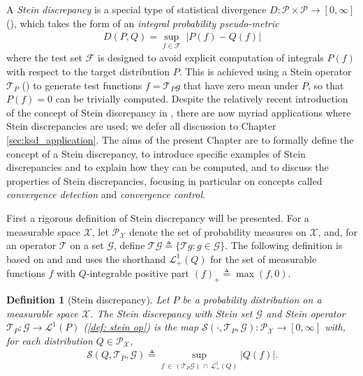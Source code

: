 \documentclass[12pt,paper=letter]{scrreprt}
\newtheorem{definition}{Definition}[chapter]
\def\defeq{\triangleq} %
\begin{document}
A \emph{Stein discrepancy} is a special type of statistical divergence $D : \mathcal{P} \times \mathcal{P} \rightarrow [0,\infty]$ (), which takes the form of an \emph{integral probability pseudo-metric} \citep{muller1997integral}
\begin{align}
    D(P,Q) = \sup_{f \in \mathcal{F}} \; | P(f) - Q(f) | \label{eq: ipm}
\end{align}
where the test set $\mathcal{F}$ is designed to avoid explicit computation of integrals $P(f)$ with respect to the target distribution $P$.
This is achieved using a Stein operator $\mathcal{T}_P$ () to generate test functions $f = \mathcal{T}_P g$ that have zero mean under $P$, so that $P(f) = 0$ can be trivially computed.
Despite the relatively recent introduction of the concept of Stein discrepancy in \citet{gorham2015measuring}, there are now myriad applications where Stein discrepancies are used; we defer all discussion to Chapter \ref{sec:ksd_application}.
The aims of the present Chapter are to formally define the concept of a Stein discrepancy, to introduce specific examples of Stein discrepancies and to explain how they can be computed, and to discuss the properties of Stein discrepancies, focusing in particular on concepts called \emph{convergence detection} and \emph{convergence control}. 

First a rigorous definition of Stein discrepancy will be presented.
For a measurable space $\mathcal{X}$, let $\mathcal{P}_{\mathcal{X}}$ denote the set of probability measures on $\mathcal{X}$, and,
for an operator $\mathcal{T}$ on a set $\mathcal{G}$, define $\mathcal{T} \mathcal{G} \defeq  \{\mathcal{T} g : g \in \mathcal{G}\}$.
The following definition is based on \citet[Sec.~3]{gorham2015measuring} and \citet[Def.~2]{barp2022targeted} 
and uses the shorthand $\mathcal{L}^1_+(Q)$ for the set of measurable functions $f$ with $Q$-integrable positive part $(f)_+ \defeq  \max(f, 0)$. %


\begin{definition}[Stein discrepancy] \label{def:stein_discrepancy}
Let $P$ be a probability distribution on a measurable space $\mathcal{X}$.
The \emph{Stein discrepancy} with Stein set $\mathcal{G}$ and Stein operator $\mathcal{T}_P : \mathcal{G} \rightarrow \mathcal{L}^1(P)$  (\cref{def: stein op}) is the map 
$\mathcal{S}(\cdot,\mathcal{T}_P,\mathcal{G}): \mathcal{P}_{\mathcal{X}}  \to  [0,\infty]$ with, for each distribution $Q\in \mathcal{P}_{\mathcal{X}}$, 
\begin{align}
\mathcal{S}(Q,\mathcal{T}_P,\mathcal{G})  \defeq 
\sup_{f\,\in\, (\mathcal{T}_P\mathcal{G})\,\cap\,\mathcal{L}^1_+(Q)} | Q(f) |.
%
%
%
\label{eq: SD def}
\end{align}
\end{definition}
\end{document}
